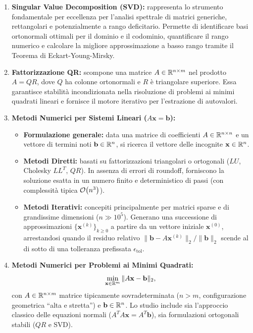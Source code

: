 \begin{enumerate}
    \item \textbf{Singular Value Decomposition (SVD):} rappresenta lo strumento fondamentale per eccellenza per l'analisi spettrale di matrici generiche, rettangolari e potenzialmente a rango deficitario. Permette di identificare basi ortonormali ottimali per il dominio e il codominio, quantificare il rango numerico e calcolare la migliore approssimazione a basso rango tramite il Teorema di Eckart-Young-Mirsky.

    \item \textbf{Fattorizzazione QR:} scompone una matrice $A \in \mathbb{R}^{n \times m}$ nel prodotto $A = QR$, dove $Q$ ha colonne ortonormali e $R$ \`e triangolare superiore. Essa garantisce stabilit\`a incondizionata nella risoluzione di problemi ai minimi quadrati lineari e fornisce il motore iterativo per l'estrazione di autovalori.

    \item \textbf{Metodi Numerici per Sistemi Lineari ($A\mathbf{x} = \mathbf{b}$):}
    \begin{itemize}
        \item \textbf{Formulazione generale:} data una matrice di coefficienti $A \in \mathbb{R}^{n \times n}$ e un vettore di termini noti $\mathbf{b} \in \mathbb{R}^n$, si ricerca il vettore delle incognite $\mathbf{x} \in \mathbb{R}^n$.
        \item \textbf{Metodi Diretti:} basati su fattorizzazioni triangolari o ortogonali ($LU$, Cholesky $LL^T$, $QR$). In assenza di errori di roundoff, forniscono la soluzione esatta in un numero finito e deterministico di passi (con complessit\`a tipica $\mathcal{O}\!\left(n^3\right)$).
        \item \textbf{Metodi Iterativi:} concepiti principalmente per matrici sparse e di grandissime dimensioni ($n \gg 10^5$). Generano una successione di approssimazioni $\{\mathbf{x}^{(k)}\}_{k \ge 0}$ a partire da un vettore iniziale $\mathbf{x}^{(0)}$, arrestandosi quando il residuo relativo $\|\mathbf{b} - A\mathbf{x}^{(k)}\|_2 / \|\mathbf{b}\|_2$ scende al di sotto di una tolleranza prefissata $\epsilon_{\text{tol}}$.
    \end{itemize}

    \item \textbf{Metodi Numerici per Problemi ai Minimi Quadrati:}
    \begin{equation}
        \min_{\mathbf{x} \in \mathbb{R}^m} \|A\mathbf{x} - \mathbf{b}\|_2,
    \end{equation}
    con $A \in \mathbb{R}^{n \times m}$ matrice tipicamente sovradeterminata ($n > m$, configurazione geometrica ``alta e stretta'') e $\mathbf{b} \in \mathbb{R}^n$. Lo studio include sia l'approccio classico delle equazioni normali ($A^T A \mathbf{x} = A^T \mathbf{b}$), sia formulazioni ortogonali stabili ($QR$ e SVD).


\end{enumerate}
